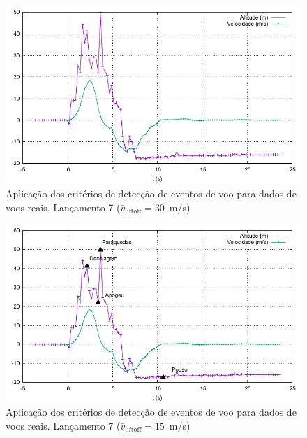 \documentclass[12pt,a4paper]{article}
\begin{document}
\begin{figure}[!ht]
	\centering
	\includegraphics[width=\textwidth]{./data/lacamentos-def-criterios/lancamento07/speedForLiftoffDetection30/trajectory}
	\caption{Aplicação dos critérios de detecção de eventos de voo para dados de voos reais. Lançamento  7 ($\bar{v}_\text{liftoff}=30$~m/s)}
	\label{fig:lancamento07-30}
\end{figure}
\begin{figure}[!ht]
	\centering
	\includegraphics[width=\textwidth]{./data/lacamentos-def-criterios/lancamento07/speedForLiftoffDetection15/trajectory}
	\caption{Aplicação dos critérios de detecção de eventos de voo para dados de voos reais. Lançamento  7 ($\bar{v}_\text{liftoff}=15$~m/s)}
	\label{fig:lancamento07-15}
\end{figure}
\end{document}
